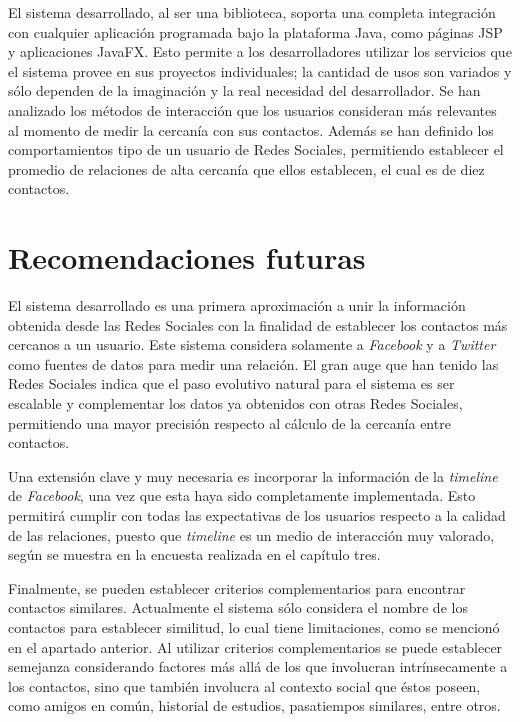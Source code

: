 El sistema desarrollado, al ser una biblioteca, soporta una completa integración con cualquier aplicación programada bajo la plataforma Java, como páginas JSP y aplicaciones JavaFX. Esto permite a los desarrolladores utilizar los servicios que el sistema provee en sus proyectos individuales; la cantidad de usos son variados y sólo dependen de la imaginación y la real necesidad del desarrollador.
Se han analizado los métodos de interacción que los usuarios consideran más relevantes al momento de medir la cercanía con sus contactos. Además se han definido los comportamientos tipo de un usuario de Redes Sociales, permitiendo establecer el promedio de relaciones de alta cercanía que ellos establecen, el cual es de diez contactos.

\section{Recomendaciones futuras}

El sistema desarrollado es una primera aproximación a unir la información obtenida desde las Redes Sociales con la finalidad de establecer los contactos más cercanos a un usuario. Este sistema considera solamente a \textit{Facebook} y a \textit{Twitter} como fuentes de datos para medir una relación. El gran auge que han tenido las Redes Sociales indica que el paso evolutivo natural para el sistema es ser escalable y complementar los datos ya obtenidos con otras Redes Sociales, permitiendo una mayor precisión respecto al cálculo de la cercanía entre contactos.

Una extensión clave y muy necesaria es incorporar la información de la \textit{timeline} de \textit{Facebook}, una vez que esta haya sido completamente implementada. Esto permitirá cumplir con todas las expectativas de los usuarios respecto a la calidad de las relaciones, puesto que \textit{timeline} es un medio de interacción muy valorado, según se muestra en la encuesta realizada en el capítulo tres.
 
Finalmente, se pueden establecer criterios complementarios para encontrar contactos similares. Actualmente el sistema sólo considera el nombre de los contactos para establecer similitud, lo cual tiene limitaciones, como se mencionó en el apartado anterior. Al utilizar criterios complementarios se puede establecer semejanza considerando factores más allá de los que involucran intrínsecamente a los contactos, sino que también involucra al contexto social que éstos poseen, como amigos en común, historial de estudios, pasatiempos similares, entre otros.
